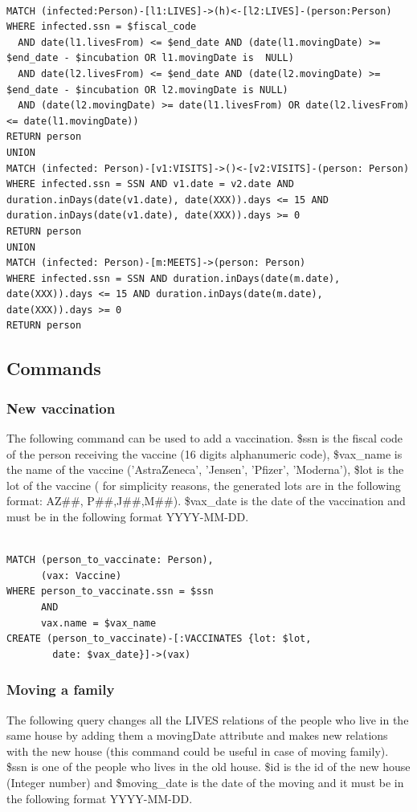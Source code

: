 \documentclass{article}
\begin{document}
\begin{lstlisting}[language=cypher, label=lst:cypher-example]

MATCH (infected:Person)-[l1:LIVES]->(h)<-[l2:LIVES]-(person:Person)
WHERE infected.ssn = $fiscal_code
  AND date(l1.livesFrom) <= $end_date AND (date(l1.movingDate) >= $end_date - $incubation OR l1.movingDate is  NULL)
  AND date(l2.livesFrom) <= $end_date AND (date(l2.movingDate) >= $end_date - $incubation OR l2.movingDate is NULL)
  AND (date(l2.movingDate) >= date(l1.livesFrom) OR date(l2.livesFrom) <= date(l1.movingDate))
RETURN person
UNION
MATCH (infected: Person)-[v1:VISITS]->()<-[v2:VISITS]-(person: Person)
WHERE infected.ssn = SSN AND v1.date = v2.date AND duration.inDays(date(v1.date), date(XXX)).days <= 15 AND duration.inDays(date(v1.date), date(XXX)).days >= 0
RETURN person
UNION
MATCH (infected: Person)-[m:MEETS]->(person: Person)
WHERE infected.ssn = SSN AND duration.inDays(date(m.date), date(XXX)).days <= 15 AND duration.inDays(date(m.date), date(XXX)).days >= 0
RETURN person
\end{lstlisting}
\newpage
\subsection{Commands}
\subsubsection{New vaccination}
The following command can be used to add a vaccination. \$ssn is the fiscal code of the person receiving the vaccine (16 digits alphanumeric code), \$vax\_name is the name of the vaccine ('AstraZeneca', 'Jensen', 'Pfizer', 'Moderna'), \$lot is the lot of the vaccine (
for simplicity reasons, the generated lots are in the following format: AZ\#\#, P\#\#,J\#\#,M\#\#). \$vax\_date is the date of the vaccination and must be in the following format YYYY-MM-DD.

\begin{lstlisting}[language=cypher, label=lst:cypher-example]

MATCH (person_to_vaccinate: Person),
      (vax: Vaccine)
WHERE person_to_vaccinate.ssn = $ssn
      AND
      vax.name = $vax_name
CREATE (person_to_vaccinate)-[:VACCINATES {lot: $lot,
        date: $vax_date}]->(vax)

\end{lstlisting}
\subsubsection{Moving a family}
The following query changes all the LIVES relations of the people who live in the same house by adding them a movingDate attribute and makes new relations with the new house (this command could be useful in case of moving family).
\$ssn is one of the people who lives in the old house. \$id is the id of the new house (Integer number) and \$moving\_date is the date of the moving and it must be in the following format YYYY-MM-DD.
\end{document}
